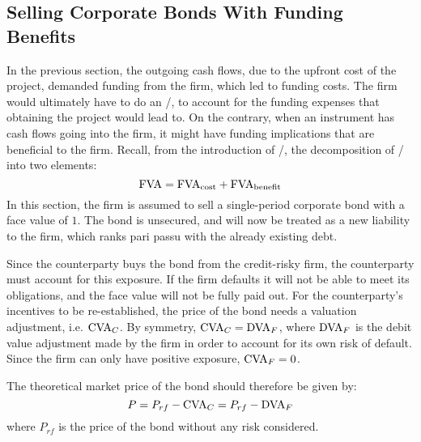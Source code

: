 \documentclass[main.tex]{subfiles}
\begin{document}
    \subsection{Selling Corporate Bonds With Funding Benefits}
    \label{sec:example-funding-benefit}
        In the previous section, 
        the outgoing cash flows, due to the upfront cost of the project,
        demanded funding from the firm, which led to funding costs. 
        The firm would ultimately have to do an \FVA/,
        to account for the funding expenses that obtaining the project would lead to.
        On the contrary, when an instrument has cash flows going into the firm,
        it might have funding implications that are beneficial to the firm.
        Recall, from the introduction of \FVA/, the decomposition of \FVA/ into two elements:
        \begin{equation*}
            \FVA/ = \FCA/ + \FBA/
        \end{equation*}
        In this section, the firm is assumed to sell a single-period corporate bond
        with a face value of $\num{1}$.
        The bond is unsecured, and will now be treated as a new liability to the firm, 
        which ranks pari passu with the already existing debt.

        Since the counterparty buys the bond from the credit-risky firm, 
        the counterparty must account for this exposure. 
        If the firm defaults it will not be able to meet its obligations, 
        and the face value will not be fully paid out. 
        For the counterparty's incentives to be re-established, 
        the price of the bond needs a valuation adjustment, i.e. $\CVA/_C$. 
        By symmetry, $\CVA/_C = \DVA/_F$, 
        where $\DVA/_F$ is the debit value adjustment made by the firm 
        in order to account for its own risk of default.\\
        Since the firm can only have positive exposure, $\CVA/_{F}=0$.

        The theoretical market price of the bond should therefore be given by:
        \begin{equation}\label{eqn:option-value-credit-risk}
            P = P_{rf} - \CVA/_C = P_{rf} - \DVA/_F
        \end{equation}
        where $P_{rf}$ is the price of the bond without any risk considered.
\end{document}
